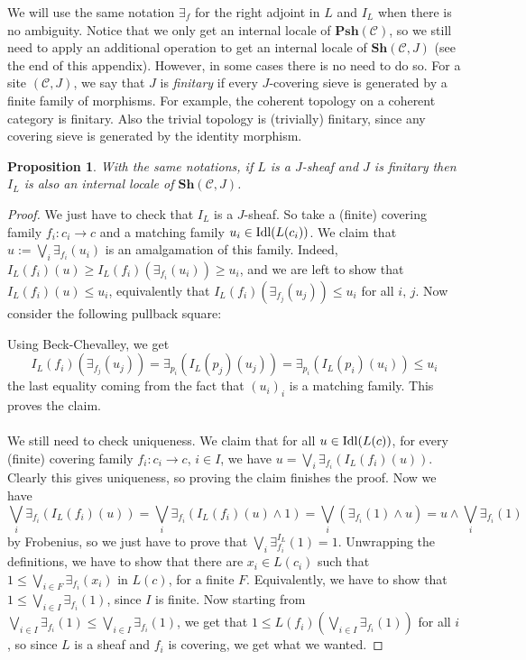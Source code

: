 \documentclass{article}
\newtheorem{proposition}[theorem]{Proposition}
\begin{document}
We will use the same notation $\exists_f$ for the right adjoint in $L$ and $I_L$ when there is no ambiguity. Notice that we only get an internal locale of $\mathbf{Psh}(\mathcal{C})$, so we still need to apply an additional operation to get an internal locale of $\mathbf{Sh}(\mathcal{C},J)$ (see the end of this appendix). However, in some cases there is no need to do so. For a site $(\mathcal{C},J)$, we say that $J$ is \emph{finitary} if every $J$-covering sieve is generated by a finite family of morphisms. For example, the coherent topology on a coherent category is finitary. Also the trivial topology is (trivially) finitary, since any covering sieve is generated by the identity morphism.

\begin{proposition}
    With the same notations, if $L$ is a $J$-sheaf and $J$ is finitary then $I_L$ is also an internal locale of $\mathbf{Sh}(\mathcal{C},J)$.
\end{proposition}
\begin{proof}
    We just have to check that $I_L$ is a $J$-sheaf. So take a (finite) covering family $f_i:c_i\xrightarrow{}c$ and a matching family $u_i\in \textup{Idl}(L(c_i))$. We claim that $u:=\bigvee_i\exists_{f_i}(u_i)$ is an amalgamation of this family. Indeed, $I_L(f_i)(u)\geq I_L(f_i)(\exists_{f_i}(u_i))\geq u_i$, and we are left to show that $I_L(f_i)(u)\leq u_i$, equivalently that $I_L(f_i)(\exists_{f_j}(u_j))\leq u_i$ for all $i,\,j$. Now consider the following pullback square:
    \begin{center}
    \end{center}
    Using Beck-Chevalley, we get 
    $$I_L(f_i)(\exists_{f_j}(u_j))=\exists_{p_i}(I_L(p_j)(u_j))=\exists_{p_i}(I_L(p_i)(u_i))\leq u_i$$
    the last equality coming from the fact that $(u_i)_i$ is a matching family. This proves the claim.\\
    \\
    We still need to check uniqueness. We claim that for all $u\in \textup{Idl}(L(c))$, for every (finite) covering family $f_i:c_i\xrightarrow{}c$, $i\in I$, we have $u=\bigvee_i \exists_{f_i}(I_L(f_i)(u))$. Clearly this gives uniqueness, so proving the claim finishes the proof. Now we have 
    $$\bigvee_i \exists_{f_i}(I_L(f_i)(u))=\bigvee_i \exists_{f_i}(I_L(f_i)(u)\land 1)=\bigvee_i (\exists_{f_i}(1)\land u)=u\land \bigvee_i \exists_{f_i}(1)$$
    by Frobenius, so we just have to prove that $\bigvee_i \exists_{f_i}^{I_L}(1)=1$. Unwrapping the definitions, we have to show that there are $x_i\in L(c_i)$ such that $1\leq \bigvee_{i\in F}\exists_{f_i}(x_i)$ in $L(c)$, for a finite $F$. Equivalently, we have to show that $1\leq \bigvee_{i\in I}\exists_{f_i}(1)$, since $I$ is finite. Now starting from $\bigvee_{i\in I}\exists_{f_i}(1)\leq \bigvee_{i\in I}\exists_{f_i}(1)$, we get that $1\leq L(f_i)(\bigvee_{i\in I}\exists_{f_i}(1))$ for all $i$, so since $L$ is a sheaf and $f_i$ is covering, we get what we wanted.
\end{proof}
\end{document}
